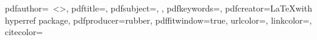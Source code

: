 \newcommand{\underscoreSpacingFour}{\_\_\_\_}
\newcommand{\spacingFour}{~~~~}

\hypersetup
{
  pdfauthor={\mybookauthor~\textless\href{mailto:\mybookemail}{\mybookemail}\textgreater},
  pdftitle={\mybooktitle},
  pdfsubject={\mydegreefull, \mybookworktypefull},
  pdfkeywords={\keywordsforpdf},
  pdfcreator={\LaTeX with hyperref package},
  pdfproducer={rubber},
  pdffitwindow={true},
  urlcolor=\myurlcolor,
  linkcolor=\mylinkcolor,
  citecolor=\mycitecolor
}




